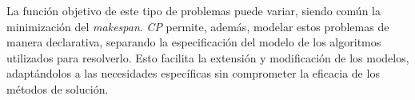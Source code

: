 \documentclass{article}
\begin{document}
La función objetivo de este tipo de problemas puede variar, siendo común la minimización del \textit{makespan}. \textit{CP} permite, además, modelar estos problemas de manera declarativa, separando la especificación del modelo de los algoritmos utilizados para resolverlo. Esto facilita la extensión y modificación de los modelos, adaptándolos a las necesidades específicas sin comprometer la eficacia de los métodos de solución.





\end{document}
